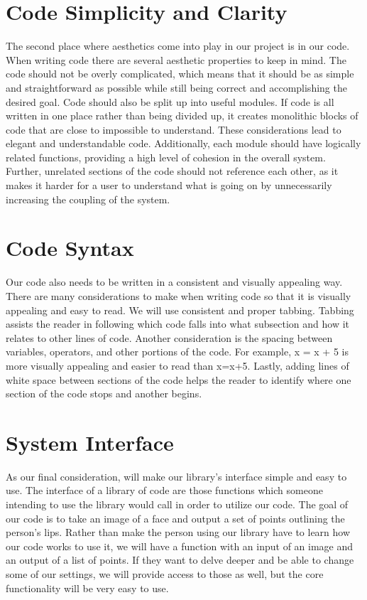\section{Code Simplicity and Clarity}
The second place where aesthetics come into play in our project is in our code. When writing code there are several aesthetic properties to keep in mind. The code should not be overly complicated, which means that it should be as simple and straightforward as possible while still being correct and accomplishing the desired goal. Code should also be split up into useful modules. If code is all written in one place rather than being divided up, it creates monolithic blocks of code that are close to impossible to understand. These considerations lead to elegant and understandable code. Additionally, each module should have logically related functions, providing a high level of cohesion in the overall system. Further, unrelated sections of the code should not reference each other, as it makes it harder for a user to understand what is going on by unnecessarily increasing the coupling of the system.

\section{Code Syntax}
Our code also needs to be written in a consistent and visually appealing way. There are many considerations to make when writing code so that it is visually appealing and easy to read. We will use consistent and proper tabbing. Tabbing assists the reader in following which code falls into what subsection and how it relates to other lines of code. Another consideration is the spacing between variables, operators, and other portions of the code. For example, x = x + 5 is more visually appealing and easier to read than x=x+5. Lastly, adding lines of white space between sections of the code helps the reader to identify where one section of the code stops and another begins.

\section{System Interface}
As our final consideration, will make our library's interface simple and easy to use. The interface of a library of code are those functions which someone intending to use the library would call in order to utilize our code. The goal of our code is to take an image of a face and output a set of points outlining the person's lips. Rather than make the person using our library have to learn how our code works to use it, we will have a function with an input of an image and an output of a list of points. If they want to delve deeper and be able to change some of our settings, we will provide access to those as well, but the core functionality will be very easy to use.
